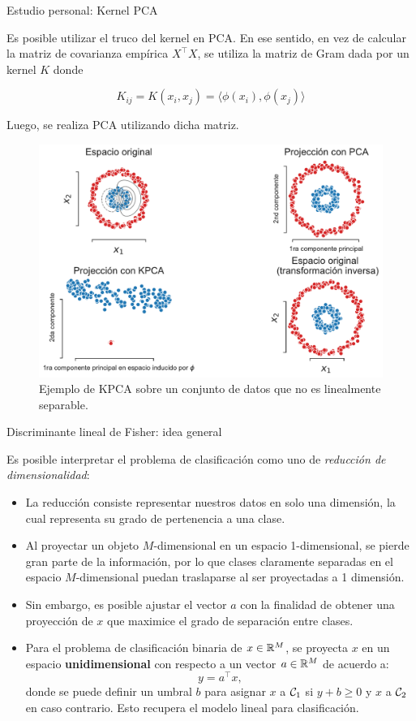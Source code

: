 \documentclass[9pt, handout]{beamer}
\begin{document}
\begin{frame}{Estudio personal: Kernel PCA}

Es posible utilizar el truco del kernel en PCA. En ese sentido, en vez de calcular la matriz de covarianza empírica $X^\top X$, se utiliza la matriz de Gram dada por un kernel $K$ donde

$$
K_{ij} = K(x_i,x_j) = \langle\phi(x_i),\phi(x_j)\rangle
$$

Luego, se realiza PCA utilizando dicha matriz.\\ \pause

\begin{figure}[ht]
    \centering
    \includegraphics[width=0.6\linewidth]{../img/cap6_kpca.pdf}
    \caption{Ejemplo de KPCA sobre un conjunto de datos que no es linealmente separable.}
    \label{fig:kpca}
\end{figure}

\end{frame}

\begin{frame}{Discriminante lineal de Fisher: idea general}
	
Es posible interpretar el problema de clasificación como uno de \emph{reducción de dimensionalidad}: \pause

\begin{itemize}
	\item La reducción consiste representar nuestros datos  en solo una dimensión, la cual representa su grado de pertenencia a una clase. \pause
	\item Al proyectar un objeto $M$-dimensional en un espacio  1-dimensional, se pierde gran parte de la información, por lo que clases claramente separadas en el espacio $M$-dimensional puedan traslaparse al ser proyectadas a 1 dimensión.\pause
	\item Sin embargo, es posible ajustar el vector $a$ con la finalidad de obtener una proyección de $x$ que maximice el grado de separación entre clases.\pause
	\item Para el problema de clasificación binaria de $x\in \mathbb{R}^M$, se proyecta $x$ en un espacio \textbf{unidimensional} con respecto a un vector $a\in\mathbb{R}^M$ de acuerdo a:
\begin{equation*}
	y = a^\top x,
\end{equation*}
donde se puede definir un umbral $b$ para asignar $x$ a ${\mathcal C}_1$ si $y+b\geq 0$ y $x$ a ${\mathcal C}_2$ en caso contrario. Esto recupera el modelo lineal para clasificación.
\end{itemize}
	
\end{frame}
\end{document}
